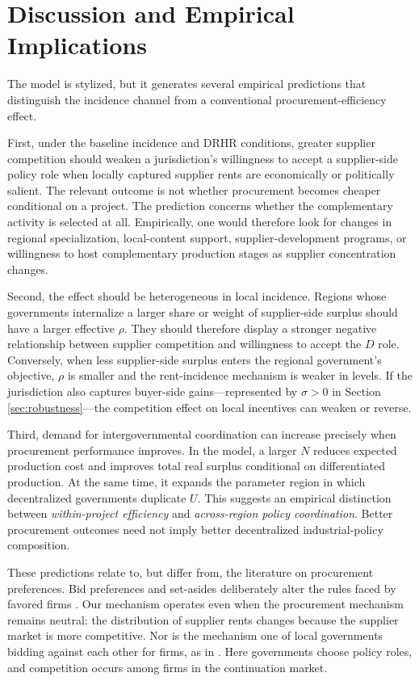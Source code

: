 \section{Discussion and Empirical Implications}
\label{sec:discussion}

The model is stylized, but it generates several empirical predictions that distinguish the incidence channel from a conventional procurement-efficiency effect.

First, under the baseline incidence and DRHR conditions, greater supplier competition should weaken a jurisdiction's willingness to accept a supplier-side policy role when locally captured supplier rents are economically or politically salient. The relevant outcome is not whether procurement becomes cheaper conditional on a project. The prediction concerns whether the complementary activity is selected at all. Empirically, one would therefore look for changes in regional specialization, local-content support, supplier-development programs, or willingness to host complementary production stages as supplier concentration changes.

Second, the effect should be heterogeneous in local incidence. Regions whose governments internalize a larger share or weight of supplier-side surplus should have a larger effective $\rho$. They should therefore display a stronger negative relationship between supplier competition and willingness to accept the $D$ role. Conversely, when less supplier-side surplus enters the regional government's objective, $\rho$ is smaller and the rent-incidence mechanism is weaker in levels. If the jurisdiction also captures buyer-side gains---represented by $\sigma>0$ in Section \ref{sec:robustness}---the competition effect on local incentives can weaken or reverse.

Third, demand for intergovernmental coordination can increase precisely when procurement performance improves. In the model, a larger $N$ reduces expected production cost and improves total real surplus conditional on differentiated production. At the same time, it expands the parameter region in which decentralized governments duplicate $U$. This suggests an empirical distinction between \emph{within-project efficiency} and \emph{across-region policy coordination}. Better procurement outcomes need not imply better decentralized industrial-policy composition.

These predictions relate to, but differ from, the literature on procurement preferences. Bid preferences and set-asides deliberately alter the rules faced by favored firms \citep{Marion2007,AtheyCoeyLevin2013}. Our mechanism operates even when the procurement mechanism remains neutral: the distribution of supplier rents changes because the supplier market is more competitive. Nor is the mechanism one of local governments bidding against each other for firms, as in \citet{Slattery2025}. Here governments choose policy roles, and competition occurs among firms in the continuation market.

